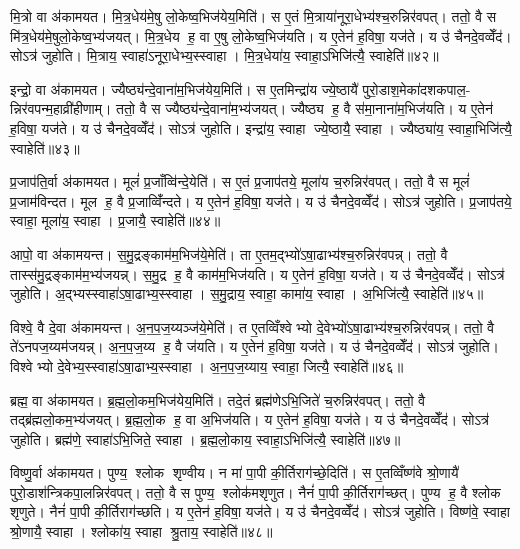 
मि॒त्रो वा अ॑कामयत। मि॒त्र॒धेय॑मे॒षु लो॒केष्व॒भिज॑येय॒मिति॑। स ए॒तं मि॒त्राया॑नूरा॒धेभ्य॑श्च॒रुन्निर॑वपत्। ततो॒ वै स मि॑त्र॒धेय॑मे॒षुलो॒केष्व॒भ्य॑जयत्। मि॒त्र॒धेय ह॒ वा ए॒षु लो॒केष्व॒भिज॑यति। य ए॒तेन॑ ह॒विषा॒ यज॑ते। य उ॑ चैनदे॒वव्वेँद॑। सोऽत्र॑ जुहोति। मि॒त्राय॒ स्वाहा॑ऽनूरा॒धेभ्य॒स्स्वाहा। मि॒त्र॒धेया॑य॒ स्वाहा॒ऽभिजि॑त्यै॒ स्वाहेति॑॥४२॥

इन्द्रो॒ वा अ॑कामयत। ज्यैष्ठ्य॑न्दे॒वाना॑म॒भिज॑येय॒मिति॑। स ए॒तमिन्द्रा॑य ज्ये॒ष्ठायै॑ पुरो॒डाश॒मेका॑दशकपाल॒- न्निर॑वपन्म॒हाव्री॑हीणाम्। ततो॒ वै स ज्यैष्ठ्य॑न्दे॒वाना॑म॒भ्य॑जयत्। ज्यैष्ठ्य ह॒ वै स॑मा॒नाना॑म॒भिज॑यति। य ए॒तेन॑ ह॒विषा॒ यज॑ते। य उ॑ चैनदे॒वव्वेँद॑। सोऽत्र॑ जुहोति। इन्द्रा॑य॒ स्वाहा ज्ये॒ष्ठायै॒ स्वाहा। ज्यैष्ठ्या॑य॒ स्वाहा॒भिजि॑त्यै॒ स्वाहेति॑॥४३॥

प्र॒जाप॑ति॒र्वा अ॑कामयत। मूलं॑ प्र॒जाँव्वि॑न्दे॒येति॑। स ए॒तं प्र॒जाप॑तये॒ मूला॑य च॒रुन्निर॑वपत्। ततो॒ वै स मूलं॑ प्र॒जाम॑विन्दत। मूल ह॒ वै प्र॒जाव्विँ॑न्दते। य ए॒तेन॑ ह॒विषा॒ यज॑ते। य उ॑ चैनदे॒वव्वेँद॑। सोऽत्र॑ जुहोति। प्र॒जाप॑तये॒ स्वाहा॒ मूला॑य॒ स्वाहा। प्र॒जायै॒ स्वाहेति॑॥४४॥

आपो॒ वा अ॑कामयन्त। स॒मु॒द्रङ्काम॑म॒भिज॑ये॒मेति॑। ता ए॒तम॒द्भ्यो॑ऽषा॒ढाभ्य॑श्च॒रुन्निर॑वपन्न्। ततो॒ वै तास्स॑मु॒द्रङ्काम॑म॒भ्य॑जयन्न्। स॒मु॒द्र ह॒ वै काम॑म॒भिज॑यति। य ए॒तेन॑ ह॒विषा॒ यज॑ते। य उ॑ चैनदे॒वव्वेँद॑। सोऽत्र॑ जुहोति। अ॒द्भ्यस्स्वाहा॑ऽषा॒ढाभ्य॒स्स्वाहा। स॒मु॒द्राय॒ स्वाहा॒ कामा॑य॒ स्वाहा। अ॒भिजि॑त्यै॒ स्वाहेति॑॥४५॥

विश्वे॒ वै दे॒वा अ॑कामयन्त। अ॒न॒प॒ज॒य्यञ्ज॑ये॒मेति॑। त ए॒तव्विँश्वेभ्यो दे॒वेभ्यो॑ऽषा॒ढाभ्य॑श्च॒रुन्निर॑वपन्न्। ततो॒ वै ते॑ऽनपज॒य्यम॑जयन्न्। अ॒न॒प॒ज॒य्य ह॒ वै ज॑यति। य ए॒तेन॑ ह॒विषा॒ यज॑ते। य उ॑ चैनदे॒वव्वेँद॑। सोऽत्र॑ जुहोति। विश्वेभ्यो दे॒वेभ्य॒स्स्वाहा॑ऽषा॒ढाभ्य॒स्स्वाहा। अ॒न॒प॒ज॒य्याय॒ स्वाहा॒ जित्यै॒ स्वाहेति॑॥४६॥

ब्रह्म॒ वा अ॑कामयत। ब्र॒ह्म॒लो॒कम॒भिज॑येय॒मिति॑। तदे॒तं ब्रह्म॑णेऽभि॒जिते॑ च॒रुन्निर॑वपत्। ततो॒ वै तद्ब्र॑ह्मलो॒कम॒भ्य॑जयत्। ब्र॒ह्म॒लो॒क ह॒ वा अ॒भिज॑यति। य ए॒तेन॑ ह॒विषा॒ यज॑ते। य उ॑ चैनदे॒वव्वेँद॑। सोऽत्र॑ जुहोति। ब्रह्म॑णे॒ स्वाहा॑ऽभि॒जिते॒ स्वाहा। ब्र॒ह्म॒लो॒काय॒ स्वाहा॒ऽभिजि॑त्यै॒ स्वाहेति॑॥४७॥

विष्णु॒र्वा अ॑कामयत। पुण्य॒ श्लोक शृण्वीय। न मा॑ पा॒पी की॒र्तिराग॑च्छे॒दिति॑। स ए॒तव्विँष्ण॑वे श्रो॒णायै॑ पुरो॒डाश॑न्त्रिकपा॒लन्निर॑वपत्। ततो॒ वै स पुण्य॒ श्लोक॑मशृणुत। नैनं॑ पा॒पी की॒र्तिराग॑च्छत्। पुण्य ह॒ वै श्लोक शृणुते। नैनं॑ पा॒पी की॒र्तिराग॑च्छति। य ए॒तेन॑ ह॒विषा॒ यज॑ते। य उ॑ चैनदे॒वव्वेँद॑। सोऽत्र॑ जुहोति। विष्ण॑वे॒ स्वाहा श्रो॒णायै॒ स्वाहा। श्लोका॑य॒ स्वाहा श्रु॒ताय॒ स्वाहेति॑॥४८॥

